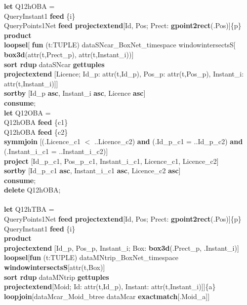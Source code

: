 \documentclass[a4paper]{article}
\newcommand{\op}[1]{\textbf{#1}}
\begin{document}
\begin{scriptsize}
\begin{tabbing}
\op{let} Q12hOBA =\\
\>QueryInstant1 \op{feed} \{i\}\\
\>QueryPoints1Net \op{feed projectextend}[Id, Pos; Prect:
\op{gpoint2rect}(.Pos)]\{p\}\\
\>\op{product}\\
\>\op{loopsel}[ \op{fun} (t:TUPLE) dataSNcar\_BoxNet\_timespace
windowintersectsS[\\
\>\>\>\op{box3d}(attr(t,Prect\_p), attr(t,Instant\_i))]\\
\>\>\op{sort rdup} dataSNcar \op{gettuples}\\
\>\>\op{projectextend} [Licence; Id\_p: attr(t,Id\_p), Pos\_p: attr(t,Pos\_p),
Instant\_i: attr(t,Instant\_i)]]\\
\>\op{sortby} [Id\_p \op{asc}, Instant\_i \op{asc}, Licence \op{asc}]\\
\op{consume};\\
\op{let} Q12OBA =\\
\>Q12hOBA \op{feed} \{c1\}\\
\>Q12hOBA \op{feed} \{c2\}\\
\>\op{symmjoin} [(.Licence\_c1 $<$ ..Licence\_c2) \op{and} (.Id\_p\_c1 =
..Id\_p\_c2) \op{and} (.Instant\_i\_c1 = ..Instant\_i\_c2)]\\
\>\op{project} [Id\_p\_c1, Pos\_p\_c1, Instant\_i\_c1, Licence\_c1,
Licence\_c2]\\
\>\op{sortby} [Id\_p\_c1 \op{asc}, Instant\_i\_c1 \op{asc}, Licence\_c2
\op{asc}]\\
\op{consume};\\
\op{delete} Q12hOBA;\\
\\
\op{let} Q12hTBA =\\
\>QueryPoints1Net \op{feed projectextend}[Id, Pos; Prect:
\op{gpoint2rect}(.Pos)]\{p\}\\
\>QueryInstant1 \op{feed} \{i\}\\
\>\op{product}\\
\>\op{projectextend} [Id\_p, Pos\_p, Instant\_i; Box: \op{box3d}(.Prect\_p,
.Instant\_i)]\\
\>\op{loopsel}[\op{fun} (t:TUPLE) dataMNtrip\_BoxNet\_timespace
\op{windowintersectsS}[attr(t,Box)]\\
\>\>\op{sort rdup} dataMNtrip \op{gettuples}\\
\>\>\op{projectextend}[Moid; Id: attr(t,Id\_p), Instant:
attr(t,Instant\_i)]]\{a\}\\
\>\op{loopjoin}[dataMcar\_Moid\_btree dataMcar \op{exactmatch}[.Moid\_a]]\\

\end{tabbing}
\end{scriptsize}
\end{document}
